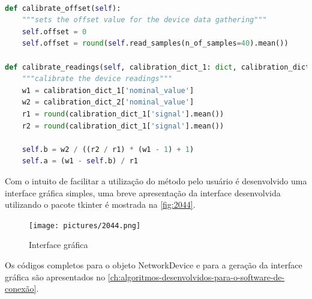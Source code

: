 \begin{lstlisting}[label={lst:objectcalibration},language=Python,caption={[Network Device calibrate offset]{Métodos de calibração do objeto NetworkDevice}}]

def calibrate_offset(self):
	"""sets the offset value for the device data gathering"""
	self.offset = 0
	self.offset = round(self.read_samples(n_of_samples=40).mean())

def calibrate_readings(self, calibration_dict_1: dict, calibration_dict_2: dict):
	"""calibrate the device readings"""
	w1 = calibration_dict_1['nominal_value']
	w2 = calibration_dict_2['nominal_value']
	r1 = round(calibration_dict_1['signal'].mean())
	r2 = round(calibration_dict_1['signal'].mean())

	self.b = w2 / ((r2 / r1) * (w1 - 1) + 1)
	self.a = (w1 - self.b) / r1

\end{lstlisting}

Com o intuito de facilitar a utilização do método pelo usuário é desenvolvido uma interface gráfica simples, uma breve apresentação da interface desenvolvida utilizando o pacote tkinter é
mostrada na \autoref{fig:2044}.

\begin{figure}[H]
	\caption{\label{fig:2044} Interface gráfica}
		\begin{center}
			\texttt{[image: pictures/2044.png]}
		\end{center}
\end{figure}

Os códigos completos para o objeto NetworkDevice e para a geração da interface gráfica são apresentados no \autoref{ch:algoritmos-desenvolvidos-para-o-software-de-conexão}.
